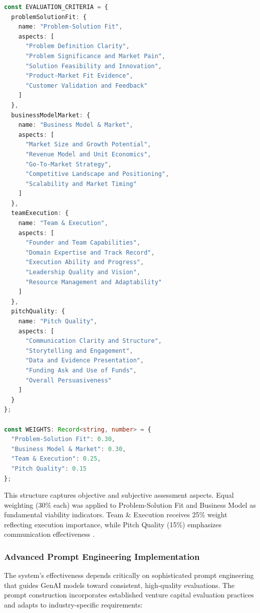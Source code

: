 \begin{lstlisting}[language=TypeScript, caption=Core Evaluation Framework Configuration, label=lst:eval-framework]
const EVALUATION_CRITERIA = {
  problemSolutionFit: {
    name: "Problem-Solution Fit",
    aspects: [
      "Problem Definition Clarity",
      "Problem Significance and Market Pain",
      "Solution Feasibility and Innovation",
      "Product-Market Fit Evidence",
      "Customer Validation and Feedback"
    ]
  },
  businessModelMarket: {
    name: "Business Model & Market",
    aspects: [
      "Market Size and Growth Potential",
      "Revenue Model and Unit Economics",
      "Go-To-Market Strategy",
      "Competitive Landscape and Positioning",
      "Scalability and Market Timing"
    ]
  },
  teamExecution: {
    name: "Team & Execution",
    aspects: [
      "Founder and Team Capabilities",
      "Domain Expertise and Track Record",
      "Execution Ability and Progress",
      "Leadership Quality and Vision",
      "Resource Management and Adaptability"
    ]
  },
  pitchQuality: {
    name: "Pitch Quality",
    aspects: [
      "Communication Clarity and Structure",
      "Storytelling and Engagement",
      "Data and Evidence Presentation",
      "Funding Ask and Use of Funds",
      "Overall Persuasiveness"
    ]
  }
};

const WEIGHTS: Record<string, number> = {
  "Problem-Solution Fit": 0.30,
  "Business Model & Market": 0.30,
  "Team & Execution": 0.25,
  "Pitch Quality": 0.15
};
\end{lstlisting}

This structure captures objective and subjective assessment aspects. Equal weighting (30\% each) was applied to Problem-Solution Fit and Business Model as fundamental viability indicators. Team \& Execution receives 25\% weight reflecting execution importance, while Pitch Quality (15\%) emphasizes communication effectiveness \cite{Gompers2020}.

\subsubsection{Advanced Prompt Engineering Implementation}
The system's effectiveness depends critically on sophisticated prompt engineering that guides GenAI models toward consistent, high-quality evaluations. The prompt construction incorporates established venture capital evaluation practices and adapts to industry-specific requirements:

